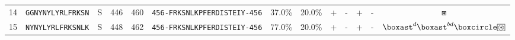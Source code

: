 \begin{tabular}{rcccccccccccc}
14 &  \texttt{GGNYNYLYRLFRKSN} &       S &    446 &   460 &  \texttt{{\scriptsize 456-}FRKSNLKPFERDISTEIY{\scriptsize -456}} &                          37.0\% &                           20.0\% &          + &           - &          + &           - &                                                                                           $ \boxast $ \\
15 &  \texttt{NYNYLYRLFRKSNLK} &       S &    448 &   462 &  \texttt{{\scriptsize 456-}FRKSNLKPFERDISTEIY{\scriptsize -456}} &                          77.0\% &                           20.0\% &          + &           - &          + &           - &                 $ \boxast^d \boxast^{bd} \boxcircle \setlength{\fboxsep}{0.5pt} \boxed{\circledast} $ \\
\bottomrule
\end{tabular}
